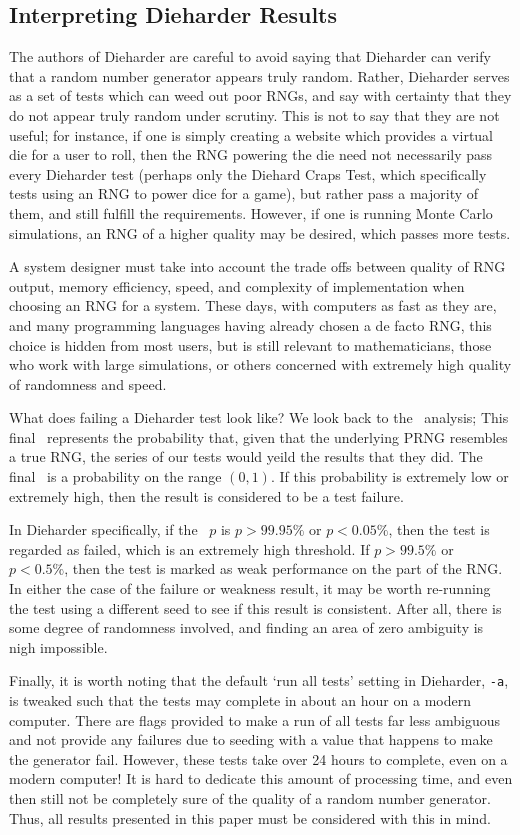 \subsection{Interpreting Dieharder Results}
The authors of Dieharder are careful to avoid saying that Dieharder can verify that a random number generator appears truly random. Rather, Dieharder serves as a set of tests which can weed out poor RNGs, and say with certainty that they do not appear truly random under scrutiny. This is not to say that they are not useful; for instance, if one is simply creating a website which provides a virtual die for a user to roll, then the RNG powering the die need not necessarily pass every Dieharder test (perhaps only the Diehard Craps Test, which specifically tests using an RNG to power dice for a game), but rather pass a majority of them, and still fulfill the requirements. However, if one is running Monte Carlo simulations, an RNG of a higher quality may be desired, which passes more tests.

A system designer must take into account the trade offs between quality of RNG output, memory efficiency, speed, and complexity of implementation when choosing an RNG for a system. These days, with computers as fast as they are, and many programming languages having already chosen a de facto RNG, this choice is hidden from most users, but is still relevant to mathematicians, those who work with large simulations, or others concerned with extremely high quality of randomness and speed.

What does failing a Dieharder test look like? We look back to the \pvalue~analysis; This final \pvalue~represents the probability that, given that the underlying PRNG resembles a true RNG, the series of our tests would yeild the results that they did. The final \pvalue~is a probability on the range $(0,1)$. If this probability is extremely low or extremely high, then the result is considered to be a test failure.

In Dieharder specifically, if the \pvalue~$p$ is $p > 99.95 \%$ or $p < 0.05 \%$, then the test is regarded as failed, which is an extremely high threshold. If $p > 99.5 \%$ or $p < 0.5 \%$, then the test is marked as weak performance on the part of the RNG. In either the case of the failure or weakness result, it may be worth re-running the test using a different seed to see if this result is consistent. After all, there is some degree of randomness involved, and finding an area of zero ambiguity is nigh impossible.

Finally, it is worth noting that the default `run all tests' setting in Dieharder, \texttt{-a}, is tweaked such that the tests may complete in about an hour on a modern computer. There are flags provided to make a run of all tests far less ambiguous and not provide any failures due to seeding with a value that happens to make the generator fail. However, these tests take over 24 hours to complete, even on a modern computer! It is hard to dedicate this amount of processing time, and even then still not be completely sure of the quality of a random number generator. Thus, all results presented in this paper must be considered with this in mind.

